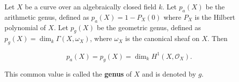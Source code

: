 Let $X$ be a curve over an algebraically closed field $k$. Let $p_a(X)$ be the arithmetic genus, defined as $p_a(X) = 1 - P_X(0)$ where $P_X$ is the Hilbert polynomial of $X$. Let $p_g(X)$ be the geometric genus, defined as $p_g(X) = \dim_k \Gamma(X, \omega_X)$, where $\omega_X$ is the canonical sheaf on $X$. Then

$$p_a(X) = p_g(X) = \dim_k H^1(X, \mathcal{O}_X).$$

This common value is called the \textbf{genus} of $X$ and is denoted by $g$.
